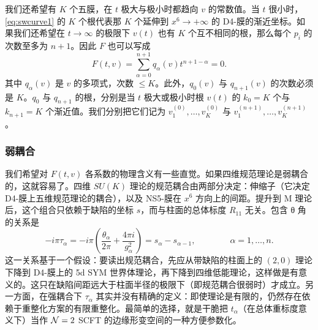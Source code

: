 我们还希望有 $K$ 个五膜，在 $t$ 极大与极小时都趋向 $v$ 的常数值。当 $t$ 很小时，\eqref{eq:swcurve1} 的 $K$ 个根代表那 $K$ 个延伸到 $x^6 \to +\infty$ 的 D4-膜的渐近坐标。如果我们还希望在 $t \to \infty$ 的极限下 $v(t)$ 也有 $K$ 个互不相同的根，那么每个 $p_i$ 的次数至多为 $n+1$。因此 $F$ 也可以写成
\begin{equation} \label{eqn:sw1}
F(t,v)= \sum_{\alpha=0}^{n+1} q_\alpha(v) t^{n+1-\alpha} = 0.
\end{equation}
其中 $q_\alpha(v)$ 是 $v$ 的多项式，次数 $\leq K$。此外，$q_0(v)$ 与 $q_{n+1}(v)$ 的次数必须是 $K$。$q_0$ 与 $q_{n+1}$ 的根，分别是当 $t$ 极大或极小时根 $v(t)$ 的 $k_0=K$ 个与 $k_{n+1}=K$ 个渐近值。我们分别把它们记为 $v^{(0)}_1, \dots, v^{(0)}_K$ 与 $v^{(n+1)}_1, \dots, v^{(n+1)}_K$。

\subsubsection*{弱耦合}

我们希望对 $F(t,v)$ 各系数的物理含义有一些直觉。如果四维规范理论是弱耦合的，这就容易了。四维 $SU(K)$ 理论的规范耦合由两部分决定：伸缩子（它决定 D4-膜上五维规范理论的耦合），以及 NS5-膜在 $x^6$ 方向上的间距。提升到 M 理论后，这个组合只依赖于缺陷的坐标 $s$，而与柱面的总体标度 $R_{11}$ 无关。包含 θ 角的关系是
\begin{equation}
\label{eq:tau-s}
- i \pi \tau_\alpha = - i\pi \left(\frac{\theta_\alpha}{2 \pi} + \frac{4 \pi
i}{g_\alpha^2}\right) = s_{\alpha} - s_{\alpha-1}, \qquad\qquad \alpha = 1, \dots, n.
\end{equation}
这一关系基于一个假设：要读出规范耦合，先应从带缺陷的柱面上的 $(2,0)$ 理论下降到 D4-膜上的 5d SYM 世界体理论，再下降到四维低能理论，这样做是有意义的。这只在缺陷间距远大于柱面半径的极限下（即规范耦合很弱时）才成立。另一方面，在强耦合下 $\tau_\alpha$ 其实并没有精确的定义：即使理论是有限的，仍然存在依赖于重整化方案的有限重整化。最简单的选择，就是干脆把 $t_\alpha$（在总体重标度意义下）当作 $\mathcal{N}=2$ SCFT 的边缘形变空间的一种方便参数化。

